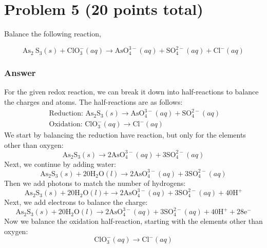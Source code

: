\documentclass[12pt]{article}
\begin{document}
\section{Problem 5 (20 points total)}
Balance the following reaction,

$$
\mathrm{As}_{2} \mathrm{~S}_{3}(s)+\mathrm{ClO}_{3}^{-}(a q) \rightarrow \mathrm{AsO}_{4}^{3-}(a q)+\mathrm{SO}_{4}^{2-}(a q)+\mathrm{Cl}^{-}(a q)
$$
\subsubsection{Answer}
For the given redox reaction, we can break it down into half-reactions to balance the charges and atoms. The half-reactions are as follows:
\begin{equation}
\begin{array}{l}
\text { Reduction: } \mathrm{As}_{2} \mathrm{S}_{3}(s) \rightarrow \mathrm{AsO}_{4}^{3-}(a q) + \mathrm{SO}_{4}^{2-}(a q) \\
\text { Oxidation: } \mathrm{ClO}_{3}^{-}(a q) \rightarrow \mathrm{Cl}^{-}(a q)
\end{array}
\end{equation}
We start by balancing the reduction have reaction, but only for the elements other than oxygen:
\begin{equation}
\mathrm{As}_{2} \mathrm{S}_{3}(s) \rightarrow 2 \mathrm{AsO}_{4}^{3-}(a q) + 3 \mathrm{SO}_{4}^{2-}(a q)
\end{equation}
Next, we continue by adding water:
\begin{equation}
\mathrm{As}_{2} \mathrm{S}_{3}(s) + 20 \mathrm{H}_{2} \mathrm{O}(l) \rightarrow 2 \mathrm{AsO}_{4}^{3-}(a q) + 3 \mathrm{SO}_{4}^{2-}(a q)
\end{equation}
Then we add photons to match the number of hydrogens:
\begin{equation}
\mathrm{As}_{2} \mathrm{S}_{3}(s) + 20 \mathrm{H}_{2} \mathrm{O}(l) + \rightarrow 2 \mathrm{AsO}_{4}^{3-}(a q) + 3 \mathrm{SO}_{4}^{2-}(a q) + 40 \mathrm{H}^{+}
\end{equation}
Next, we add electrons to balance the charge:
\begin{equation}
\mathrm{As}_{2} \mathrm{S}_{3}(s) + 20 \mathrm{H}_{2} \mathrm{O}(l) \rightarrow 2 \mathrm{AsO}_{4}^{3-}(a q) + 3 \mathrm{SO}_{4}^{2-}(a q) + 40 \mathrm{H}^{+} + 28 \mathrm{e}^{-}
\end{equation}
Now we balance the oxidation half-reaction, starting with the elements other than oxygen:
\begin{equation}
\mathrm{ClO}_{3}^{-}(a q) \rightarrow \mathrm{Cl}^{-}(a q)
\end{equation}
\end{document}
